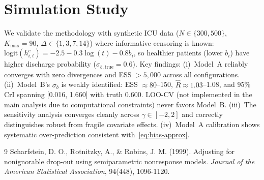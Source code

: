 \documentclass[twoside,11pt]{article}
\begin{document}
\section{Simulation Study} \label{app:simulation}
We validate the methodology with synthetic ICU data ($N \in \{300, 500\}$, $K_{\max} = 90$, $\Delta \in \{1, 3, 7, 14\}$) where informative censoring is known: $\text{logit}(h^c_{i,t}) = -2.5 - 0.3\log(t) - 0.8 b_i$, so healthier patients (lower $b_i$) have higher discharge probability ($\sigma_{b,\text{true}} = 0.6$). Key findings: (i)~Model~A reliably converges with zero divergences and ESS $> 5,000$ across all configurations. (ii)~Model~B's $\sigma_b$ is weakly identified: ESS $\approx 80$--150, $\hat{R} \approx 1.03$--1.08, and 95\% CrI spanning [0.016, 1.660] with truth 0.600. LOO-CV (not implemented in the main analysis due to computational constraints) never favors Model~B. (iii)~The sensitivity analysis converges cleanly across $\gamma \in [-2, 2]$ and correctly distinguishes robust from fragile covariate effects. (iv)~Model~A calibration shows systematic over-prediction consistent with~\eqref{eq:bias-approx}.

\begin{thebibliography}{9}
Scharfstein, D. O., Rotnitzky, A., \& Robins, J. M. (1999).
Adjusting for nonignorable drop-out using semiparametric nonresponse models.
\textit{Journal of the American Statistical Association}, 94(448), 1096-1120.
\end{thebibliography}
\end{document}
